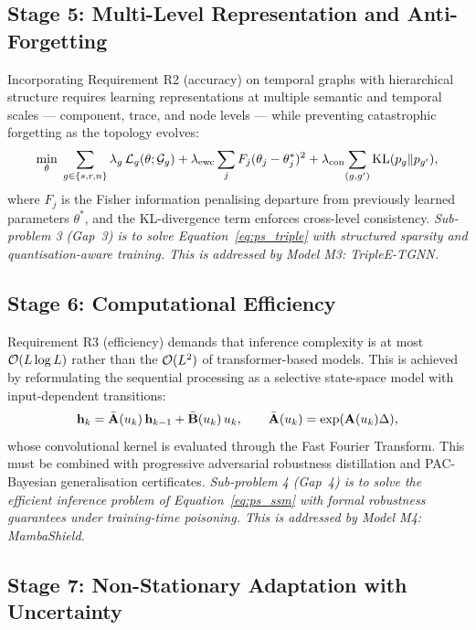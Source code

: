 \subsection{Stage 5: Multi-Level Representation and Anti-Forgetting}

Incorporating Requirement R2 (accuracy) on temporal graphs with hierarchical structure requires learning representations at multiple semantic and temporal scales --- component, trace, and node levels --- while preventing catastrophic forgetting as the topology evolves:\begin{equation}
\min_\theta\;
\sum_{g\in\{s,r,n\}}\lambda_g\,\mathcal{L}_g(\theta;\mathcal{G}_g)
+ \lambda_{\mathrm{ewc}}\sum_j F_j(\theta_j-\theta_{j}^{*})^2
+ \lambda_{\mathrm{con}}\!\sum_{(g,g')}\mathrm{KL}(p_g\|p_{g'}),
\label{eq:ps_triple}
\end{equation}
where $F_j$ is the Fisher information penalising departure from previously learned parameters $\theta^*$, and the KL-divergence term enforces cross-level consistency. \emph{Sub-problem 3 (Gap~3) is to solve Equation~\eqref{eq:ps_triple} with structured sparsity and quantisation-aware training. This is addressed by Model M3: TripleE-TGNN.}

\subsection{Stage 6: Computational Efficiency}

Requirement R3 (efficiency) demands that inference complexity is at most $\mathcal{O}(L\log L)$ rather than the $\mathcal{O}(L^2)$ of transformer-based models. This is achieved by reformulating the sequential processing as a selective state-space model with input-dependent transitions:
\begin{equation}
\mathbf{h}_{k} = \bar{\mathbf{A}}(u_k)\,\mathbf{h}_{k-1} + \bar{\mathbf{B}}(u_k)\,u_k,
\qquad
\bar{\mathbf{A}}(u_k)=\exp(\mathbf{A}(u_k)\Delta),
\label{eq:ps_ssm}
\end{equation}
whose convolutional kernel is evaluated through the Fast Fourier Transform. This must be combined with progressive adversarial robustness distillation and PAC-Bayesian generalisation certificates. \emph{Sub-problem 4 (Gap~4) is to solve the efficient inference problem of Equation~\eqref{eq:ps_ssm} with formal robustness guarantees under training-time poisoning. This is addressed by Model M4: MambaShield.}

\subsection{Stage 7: Non-Stationary Adaptation with Uncertainty}

